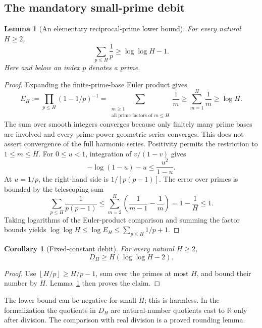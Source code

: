 \documentclass[11pt,a4paper]{article}
\newtheorem{lemma}[theorem]{Lemma}
\newtheorem{corollary}[theorem]{Corollary}
\theoremstyle{definition}
\theoremstyle{remark}
\numberwithin{equation}{section}
\newcommand{\R}{\mathbb R}
\newcommand{\floor}[1]{\left\lfloor #1\right\rfloor}
\begin{document}
\subsection{The mandatory small-prime debit}
\begin{lemma}[An elementary reciprocal-prime lower bound]\label{lem:prime-lower}
For every natural $H\ge2$,
\begin{equation}\label{eq:prime-lower}
 \sum_{p\le H}\frac1p\ge\log\log H-1.
\end{equation}
Here and below an index $p$ denotes a prime.
\end{lemma}
\begin{proof}
Expanding the finite-prime-base Euler product gives
\[
 E_H:=\prod_{p\le H}(1-1/p)^{-1}
   =\sum_{\substack{m\ge1\\\text{all prime factors of }m\le H}}\frac1m
   \ge\sum_{m=1}^H\frac1m\ge\log H.
\]
The sum over smooth integers converges because only finitely many prime bases
are involved and every prime-power geometric series converges. This does not
assert convergence of the full harmonic series. Positivity permits the
restriction to $1\le m\le H$.
For $0\le u<1$, integration of $v/(1-v)$ gives
\[
 -\log(1-u)-u\le\frac{u^2}{1-u}.
\]
At $u=1/p$, the right-hand side is $1/[p(p-1)]$. The error over primes is bounded
by the telescoping sum
\[
 \sum_{p\le H}\frac1{p(p-1)}
 \le\sum_{m=2}^H\left(\frac1{m-1}-\frac1m\right)
 =1-\frac1H\le1.
\]
Taking logarithms of the Euler-product comparison and summing the factor bounds
yields $\log\log H\le\log E_H\le\sum_{p\le H}1/p+1$.
\end{proof}

\begin{corollary}[Fixed-constant debit]\label{cor:debit-lower}
For every natural $H\ge2$,
\begin{equation}\label{eq:debit-lower}
 D_H\ge H(\log\log H-2).
\end{equation}
\end{corollary}
\begin{proof}
Use $\floor{H/p}\ge H/p-1$, sum over the primes at most $H$, and bound their
number by $H$. Lemma~\ref{lem:prime-lower} then proves the claim.
\end{proof}
The lower bound can be negative for small $H$; this is harmless. In the
formalization the quotients in $D_H$ are natural-number quotients cast to
$\R$ only after division. The comparison with real division is a proved
rounding lemma.
\end{document}
